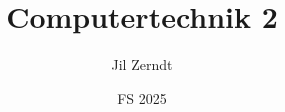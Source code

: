 \documentclass[a4paper, fontsize = 8pt, landscape]{scrartcl}
\title{Computertechnik 2}
\author{Jil Zerndt}
\date{FS 2025}
\begin{document}
\begin{multicols}{2}
	\thispagestyle{TitlePageStyle}
	\maketitle
	\sffamily
	
	\raggedcolumns
	\pagebreak
	
	\raggedcolumns
	\pagebreak
	
	\raggedcolumns
	\pagebreak
	
	\raggedcolumns
	\pagebreak
	
	\raggedcolumns
	\pagebreak
	
	\raggedcolumns
\end{multicols}
\end{document}
